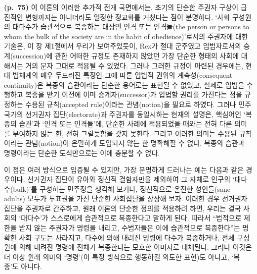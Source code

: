 \textbf{(p.~75)} 이 이론의 이러한 추가적 전개 국면에서는, 초기의 단순한
주권자 구상이 급진적인 변형까지는 아니더라도 일정한 정교화를 거쳤다는
점이 분명하다. ‘사회 구성원의 대다수가 습관적으로 복종하는 대상인 인격
또는 인격들(the person or persons to whom the bulk of the society are in
the habit of obedience)’로서의 주권자에 대한 기술은, 이 장 제1절에서
우리가 보여주었듯이, Rex가 절대 군주였고 입법자로서의 승계(succession)에
관한 어떠한 규정도 존재하지 않았던 가장 단순한 형태의 사회에 대해서는
거의 문자 그대로 적용될 수 있었다. 그러나 그러한 규정이 마련된 경우에는,
현대 법체계의 매우 두드러진 특징인 그에 따른 입법적 권위의
계속성(consequent continuity)은 복종의 습관이라는 단순한 용어로는 표현될
수 없었고, 실제로 입법을 수행하고 복종을 받기 이전에 이미
승계자(successor)가 입법할 권리를 가진다는 점을 규정하는 수용된
규칙(accepted rule)이라는 관념(notion)을 필요로 하였다. 그러나
민주국가의 선거권자 집단(electorate)과 주권자를 동일시하는 현재의
설명은, 핵심어인 ‘복종의 습관’과 ‘인격 또는 인격들’에, 단순한 사례에
적용되었을 때와는 전혀 다른 의미를 부여하지 않는 한, 전혀 그럴듯함을
갖지 못한다. 그리고 이러한 의미는 수용된 규칙이라는 관념(notion)이
은밀하게 도입되지 않는 한 명확해질 수 없다. 복종의 습관과 명령이라는
단순한 도식만으로는 이에 충분할 수 없다.

이 점은 여러 방식으로 입증될 수 있지만, 가장 분명하게 드러나는 예는
다음과 같은 경우이다. 선거권자 집단이 유아와 정신적 결함자만을 제외하여
그 자체로 인구의 ‘대다수(bulk)’를 구성하는 민주정을 생각해 보거나,
정신적으로 온전한 성인들(sane adults) 모두가 투표권을 가진 단순한
사회집단을 상상해 보자. 이러한 경우 선거권자 집단을 주권자로 간주하고,
원래 이론의 단순한 정의를 적용하려 하면, 우리는 결국 사회의 ‘대다수’가
스스로에게 습관적으로 복종한다고 말하게 된다. 따라서 “법적으로 제한을
받지 않는 주권자가 명령을 내리고, 수범자들은 이에 습관적으로
복종한다”는 명확한 사회 구도는 사라지고, 다수에 의해 내려진 명령에
다수가 복종하거나, 전체 구성원에 의해 내려진 명령에 전체가 복종한다는
모호한 이미지로 대체된다. 그러나 이것은 더 이상 원래 의미의
‘명령’(이 특정 방식으로 행동하길 의도한 표현)도
아니고, ‘복종’도 아니다.

